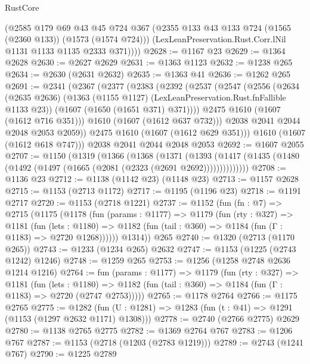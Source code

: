 \begin{lexlean}{RustCore}
\begin{coremodule}
        (@2585
          @179
          @69
          @43
          @45
          @724
          @367
          (@2355 @133 @43 @133 @724 (@1565 (@2360 @133)) (@1573 (@1574 @724)))
          (LexLeanPreservation.Rust.Corr.lNil @1131 @1133 @1135 @2333 @371))))
@2628 := @1167 @23
@2629 := @1364 @2628
@2630 := @2627 @2629
@2631 := @1363 @1123
@2632 := @1238 @265
@2634 := @2630 (@2631 @2632)
@2635 := @1363 @41
@2636 := @1262 @265
@2691 := @2341
    (@2367
      (@2377
        (@2383
          (@2392
            (@2537
              (@2547
                (@2556
                  (@2634
                    (@2635 @2636)
                    (@1363 (@1155 @1127) (LexLeanPreservation.Rust.fnFallible @1133 @23))
                    (@1607 (@1650 (@1651 @371) @371))))
                @2475
                @1610
                (@1607 (@1612 @716 @351)))
              @1610
              (@1607 (@1612 @637 @732)))
            @2038
            @2041
            @2044
            @2048
            @2053
            @2059))
        @2475
        @1610
        (@1607 (@1612 @629 @351)))
      @1610
      (@1607 (@1612 @618 @747)))
    @2038
    @2041
    @2044
    @2048
    @2053
@2692 := @1607 @2055
@2707 := @1150
    (@1319
      (@1366
        (@1368
          (@1371
            (@1393
              (@1417 (@1435 (@1480 (@1492 (@1497 (@1665 (@2081 (@2323 (@2691 @2692))))))))))))))
@2708 := @1136 @23
@2712 := @1138 (@1142 @23) (@1148 @23)
@2713 := @1157 @2628
@2715 := @1153 (@2713 @1172)
@2717 := @1195 (@1196 @23)
@2718 := @1191 @2717
@2720 := @1153 (@2718 @1221)
@2737 := @1152
    (fun (fn : @7) =>
    @2715
      (@1175
        (@1178
          (fun (params : @1177) =>
          @1179
            (fun (rty : @327) =>
            @1181
              (fun (lets : @1180) =>
              @1182 (fun (tail : @360) => @1184 (fun (Γ : @1183) => @2720 @1268))))))
        @1314))
    @265
@2740 := @1320 (@2713 (@1170 @265))
@2743 := @1233 (@1234 @265) @2632
@2747 := @1153 (@1225 (@2743 @1242) @1246)
@2748 := @1259 @265
@2753 := @1256 (@1258 @2748 @2636 @1214 @1216)
@2764 := fun (params : @1177) =>
  @1179
    (fun (rty : @327) =>
    @1181
      (fun (lets : @1180) =>
      @1182 (fun (tail : @360) => @1184 (fun (Γ : @1183) => @2720 (@2747 @2753)))))
@2765 := @1178 @2764
@2766 := @1175 @2765
@2775 := @1282 (fun (U : @1281) => @1283 (fun (t : @41) => @1291 (@1153 (@1297 @2632 @1171) @1308)))
@2778 := @2740 (@2766 @2775) @2629
@2780 := @1138 @2765 @2775
@2782 := @1369 @2764 @767
@2783 := @1206 @767
@2787 := @1153 (@2718 (@1203 (@2783 @1219)))
@2789 := @2743 (@1241 @767)
@2790 := @1225 @2789

\end{coremodule}
\end{lexlean}
